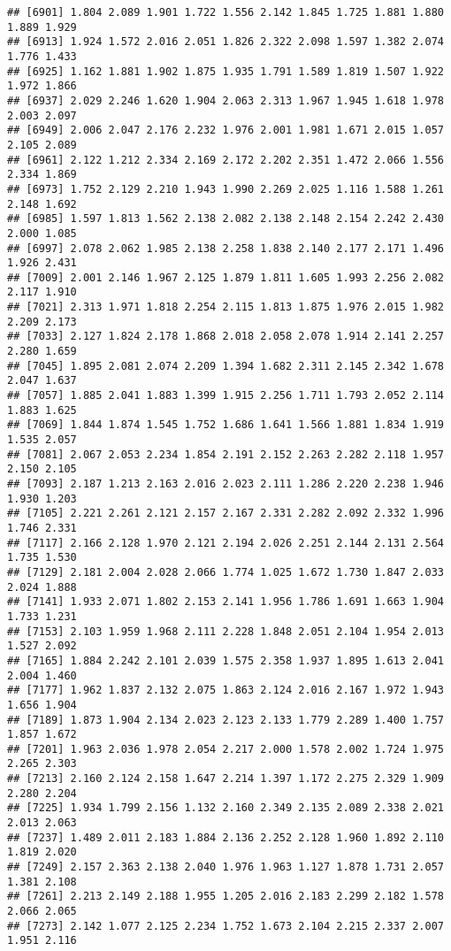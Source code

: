 \documentclass[
]{article}
\begin{document}
\begin{verbatim}
## [6901] 1.804 2.089 1.901 1.722 1.556 2.142 1.845 1.725 1.881 1.880 1.889 1.929
## [6913] 1.924 1.572 2.016 2.051 1.826 2.322 2.098 1.597 1.382 2.074 1.776 1.433
## [6925] 1.162 1.881 1.902 1.875 1.935 1.791 1.589 1.819 1.507 1.922 1.972 1.866
## [6937] 2.029 2.246 1.620 1.904 2.063 2.313 1.967 1.945 1.618 1.978 2.003 2.097
## [6949] 2.006 2.047 2.176 2.232 1.976 2.001 1.981 1.671 2.015 1.057 2.105 2.089
## [6961] 2.122 1.212 2.334 2.169 2.172 2.202 2.351 1.472 2.066 1.556 2.334 1.869
## [6973] 1.752 2.129 2.210 1.943 1.990 2.269 2.025 1.116 1.588 1.261 2.148 1.692
## [6985] 1.597 1.813 1.562 2.138 2.082 2.138 2.148 2.154 2.242 2.430 2.000 1.085
## [6997] 2.078 2.062 1.985 2.138 2.258 1.838 2.140 2.177 2.171 1.496 1.926 2.431
## [7009] 2.001 2.146 1.967 2.125 1.879 1.811 1.605 1.993 2.256 2.082 2.117 1.910
## [7021] 2.313 1.971 1.818 2.254 2.115 1.813 1.875 1.976 2.015 1.982 2.209 2.173
## [7033] 2.127 1.824 2.178 1.868 2.018 2.058 2.078 1.914 2.141 2.257 2.280 1.659
## [7045] 1.895 2.081 2.074 2.209 1.394 1.682 2.311 2.145 2.342 1.678 2.047 1.637
## [7057] 1.885 2.041 1.883 1.399 1.915 2.256 1.711 1.793 2.052 2.114 1.883 1.625
## [7069] 1.844 1.874 1.545 1.752 1.686 1.641 1.566 1.881 1.834 1.919 1.535 2.057
## [7081] 2.067 2.053 2.234 1.854 2.191 2.152 2.263 2.282 2.118 1.957 2.150 2.105
## [7093] 2.187 1.213 2.163 2.016 2.023 2.111 1.286 2.220 2.238 1.946 1.930 1.203
## [7105] 2.221 2.261 2.121 2.157 2.167 2.331 2.282 2.092 2.332 1.996 1.746 2.331
## [7117] 2.166 2.128 1.970 2.121 2.194 2.026 2.251 2.144 2.131 2.564 1.735 1.530
## [7129] 2.181 2.004 2.028 2.066 1.774 1.025 1.672 1.730 1.847 2.033 2.024 1.888
## [7141] 1.933 2.071 1.802 2.153 2.141 1.956 1.786 1.691 1.663 1.904 1.733 1.231
## [7153] 2.103 1.959 1.968 2.111 2.228 1.848 2.051 2.104 1.954 2.013 1.527 2.092
## [7165] 1.884 2.242 2.101 2.039 1.575 2.358 1.937 1.895 1.613 2.041 2.004 1.460
## [7177] 1.962 1.837 2.132 2.075 1.863 2.124 2.016 2.167 1.972 1.943 1.656 1.904
## [7189] 1.873 1.904 2.134 2.023 2.123 2.133 1.779 2.289 1.400 1.757 1.857 1.672
## [7201] 1.963 2.036 1.978 2.054 2.217 2.000 1.578 2.002 1.724 1.975 2.265 2.303
## [7213] 2.160 2.124 2.158 1.647 2.214 1.397 1.172 2.275 2.329 1.909 2.280 2.204
## [7225] 1.934 1.799 2.156 1.132 2.160 2.349 2.135 2.089 2.338 2.021 2.013 2.063
## [7237] 1.489 2.011 2.183 1.884 2.136 2.252 2.128 1.960 1.892 2.110 1.819 2.020
## [7249] 2.157 2.363 2.138 2.040 1.976 1.963 1.127 1.878 1.731 2.057 1.381 2.108
## [7261] 2.213 2.149 2.188 1.955 1.205 2.016 2.183 2.299 2.182 1.578 2.066 2.065
## [7273] 2.142 1.077 2.125 2.234 1.752 1.673 2.104 2.215 2.337 2.007 1.951 2.116

\end{verbatim}
\end{document}
